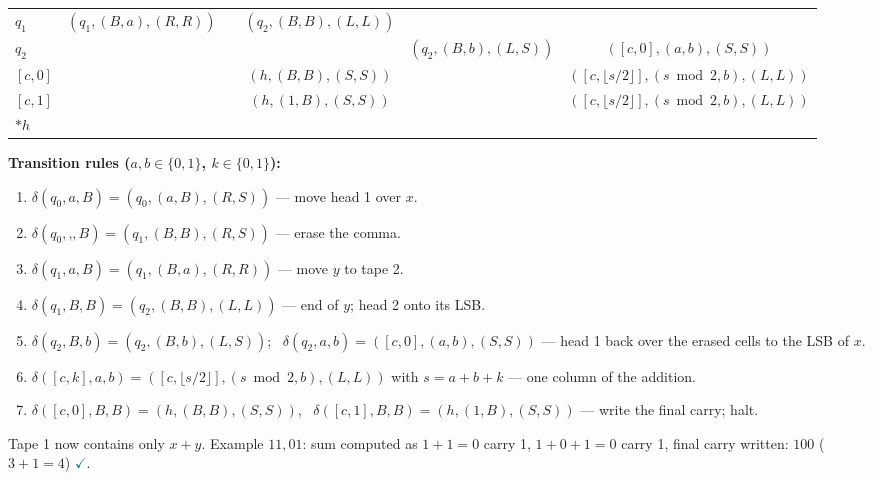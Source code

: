 \documentclass[11pt,a4paper]{article}
\newcommand{\ok}{\textcolor{teal}{\ensuremath{\checkmark}}}
\begin{document}
\begin{solution}
\begin{center}
\begin{tabular}{l|ccccc}
$q_1$ & $(q_1,(B,a),(R,R))$ & & $(q_2,(B,B),(L,L))$ & & \\
$q_2$ & & & & $(q_2,(B,b),(L,S))$ & $([c,0],(a,b),(S,S))$\\
$[c,0]$ & & & $(h,(B,B),(S,S))$ & & $([c,\lfloor s/2\rfloor],(s\bmod2,b),(L,L))$\\
$[c,1]$ & & & $(h,(1,B),(S,S))$ & & $([c,\lfloor s/2\rfloor],(s\bmod2,b),(L,L))$\\
$*h$ & & & & & \\\bottomrule\end{tabular}\end{center}
\par\noindent\textbf{Transition rules ($a,b\in\{0,1\}$, $k\in\{0,1\}$):}
{\small\begin{enumerate}[label=\arabic*.,itemsep=0pt]
\item $\delta(q_0,a,B)=(q_0,(a,B),(R,S))$ --- move head 1 over $x$.
\item $\delta(q_0,\text{,},B)=(q_1,(B,B),(R,S))$ --- erase the comma.
\item $\delta(q_1,a,B)=(q_1,(B,a),(R,R))$ --- move $y$ to tape 2.
\item $\delta(q_1,B,B)=(q_2,(B,B),(L,L))$ --- end of $y$; head 2 onto its LSB.
\item $\delta(q_2,B,b)=(q_2,(B,b),(L,S))$; \ $\delta(q_2,a,b)=([c,0],(a,b),(S,S))$ --- head 1 back over the erased cells to the LSB of $x$.
\item $\delta([c,k],a,b)=([c,\lfloor s/2\rfloor],(s\bmod 2,b),(L,L))$ with $s=a+b+k$ --- one column of the addition.
\item $\delta([c,0],B,B)=(h,(B,B),(S,S))$, \ $\delta([c,1],B,B)=(h,(1,B),(S,S))$ --- write the final carry; halt.
\end{enumerate}}
Tape 1 now contains only $x+y$. Example $11,01$: sum computed as $1+1=0$ carry 1, $1+0+1=0$ carry 1, final carry written: $100$ ($3+1=4$) \ok.
\end{solution}
\end{document}
